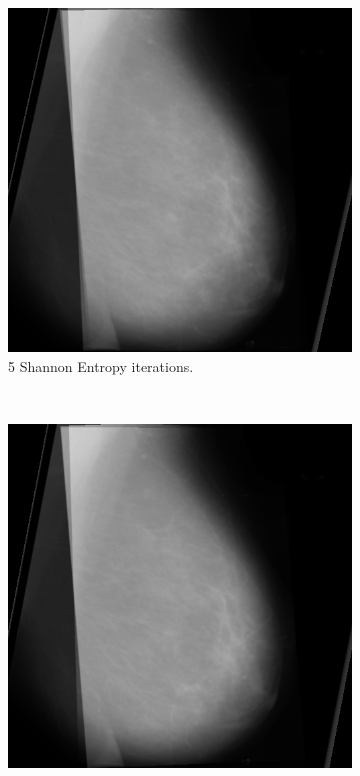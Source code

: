 \begin{figure}[H]
    \centering
    \begin{subfigure}[t]{0.3\textwidth}
        \includegraphics[width=\textwidth]{Appendix5/sample1/shannon/s-5-final.png}
        \caption{5 Shannon Entropy iterations.}
        \label{fig:app-5-shannon-sample1}
    \end{subfigure} \hfill
    ~ %
    \begin{subfigure}[t]{0.3\textwidth}
        \includegraphics[width=\textwidth]{Appendix5/sample1/shannon/s-10-final.png}

\end{subfigure}
\end{figure}
